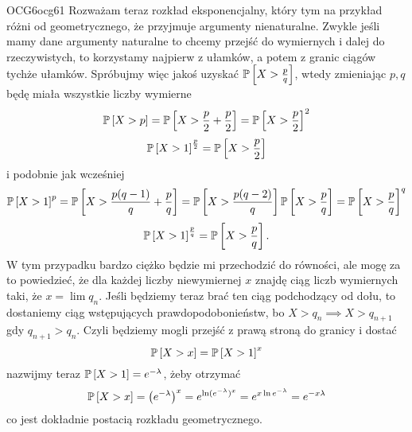 \documentclass{article}
\begin{document}
\begin{ocg}{OCG6}{ocg6}{1}
Rozważam teraz rozkład eksponencjalny, który tym na przykład różni od geometrycznego, że przyjmuje argumenty nienaturalne. Zwykle jeśli mamy dane argumenty naturalne to chcemy przejść do wymiernych i dalej do rzeczywistych, to korzystamy najpierw z ułamków, a potem z granic ciągów tychże ułamków. Spróbujmy więc jakoś uzyskać $\prob{X>\frac{p}{q}}$, wtedy zmieniając $p,q$ będę miała wszystkie liczby wymierne
$$\prob{X>p}=\prob{X>\frac{p}{2}+\frac{p}{2}}=\prob{X>\frac{p}{2}}^2$$
$$\prob{X>1}^{\frac{p}{2}}=\prob{X>\frac{p}{2}}$$
i podobnie jak wcześniej
$$\prob{X>1}^p=\prob{X>\frac{p(q-1)}{q}+\frac{p}{q}}=\prob{X>\frac{p(q-2)}{q}}\prob{X>\frac{p}{q}}=\prob{X>\frac{p}{q}}^q$$
$$\prob{X>1}^{\frac{p}{q}}=\prob{X>\frac{p}{q}}.$$
W tym przypadku bardzo ciężko będzie mi przechodzić do równości, ale mogę za to powiedzieć, że dla każdej liczby niewymiernej $x$ znajdę ciąg liczb wymiernych taki, że $x=\lim q_n$. Jeśli będziemy teraz brać ten ciąg podchodzący od dołu, to dostaniemy ciąg wstępujących prawdopodobonieństw, bo $X>q_n\implies X>q_{n+1}$ gdy $q_{n+1}>q_n$. Czyli będziemy mogli przejść z prawą stroną do granicy i dostać
$$\prob{X>x}=\prob{X>1}^x$$
nazwijmy teraz $\prob{X>1}=e^{-\lambda}$, żeby otrzymać
$$\prob{X>x}=\left(e^{-\lambda}\right)^x=e^{\ln(e^{-\lambda})^x}=e^{x\ln e^{-\lambda}}=e^{-x\lambda}$$
co jest dokładnie postacią rozkładu geometrycznego.
\end{ocg}

\end{document}
